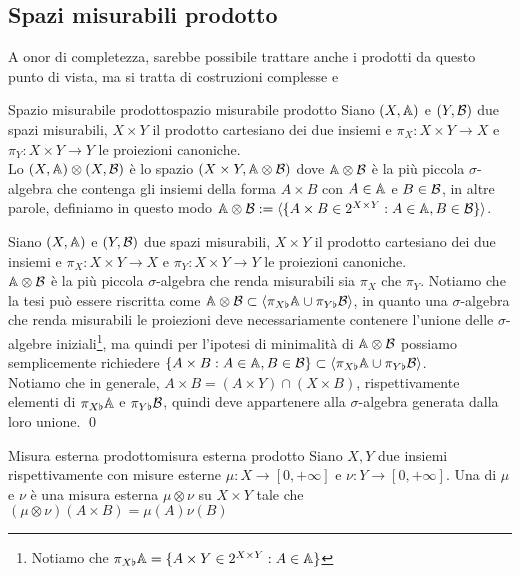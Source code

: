 \documentclass[openany]{book}
\begin{document}
\subsection{Spazi misurabili prodotto}

A onor di completezza, sarebbe possibile trattare anche i prodotti da questo punto di vista, ma si tratta di costruzioni complesse e 

\begin{definition}{Spazio misurabile prodotto}{spazio misurabile prodotto}
    Siano $(X,\mathbb{A})$ e $(Y,\mathcal{B})$ due spazi misurabili, $X\times Y$ il prodotto cartesiano dei due insiemi e $\pi_X : X\times Y \to X$ e $\pi_Y : X\times Y \to Y$ le proiezioni canoniche.\\
    Lo  $(X,\mathbb{A})\otimes (X,\mathcal{B})$ è lo spazio $(X\times Y, \mathbb{A} \otimes \mathcal{B})$ dove $\mathbb{A} \otimes\mathcal{B}$ è la più piccola $\sigma$-algebra che contenga gli insiemi della forma $A\times B$ con $A \in \mathbb{A}$ e $B \in \mathcal{B}$, in altre parole, definiamo in questo modo $\mathbb{A}\otimes\mathcal{B} := \langle\{A\times B \in 2^{X\times Y} : A \in \mathbb{A}, B\in \mathcal{B}\}\rangle$.
\end{definition}
\begin{remark}{}{}
    Siano $(X,\mathbb{A})$ e $(Y,\mathcal{B})$ due spazi misurabili, $X\times Y$ il prodotto cartesiano dei due insiemi e $\pi_X : X\times Y \to X$ e $\pi_Y : X\times Y \to Y$ le proiezioni canoniche.\\
    $\mathbb{A} \otimes \mathcal{B}$ è la più piccola $\sigma$-algebra che renda misurabili sia $\pi_X$ che $\pi_Y$.
    \proof
    Notiamo che la tesi può essere riscritta come $\mathbb{A}\otimes\mathcal{B} \subset \langle\pi_{X\flat} \mathbb{A} \cup \pi_{Y\flat} \mathcal{B}\rangle $, in quanto una $\sigma$-algebra che renda misurabili le proiezioni deve necessariamente contenere l'unione delle $\sigma$-algebre iniziali\footnote{Notiamo che $\pi_{X\flat}\mathbb{A} = \{A \times Y \in 2^{X\times Y} : A \in \mathbb{A}\}$}, ma quindi per l'ipotesi di minimalità di $\mathbb{A}\otimes\mathcal{B}$ possiamo semplicemente richiedere $\{A\times B : A \in \mathbb{A}, B \in \mathcal{B}\}\subset \langle\pi_{X\flat} \mathbb{A} \cup \pi_{Y\flat} \mathcal{B}\rangle$.\\
    Notiamo che in generale, $A \times B = (A\times Y) \cap (X \times B)$, rispettivamente elementi di $\pi_{X\flat} \mathbb{A}$ e $\pi_{Y\flat} \mathcal{B}$, quindi deve appartenere alla $\sigma$-algebra generata dalla loro unione.
    \qed
\end{remark}

\begin{definition}{Misura esterna prodotto}{misura esterna prodotto}
    Siano $X,Y$ due insiemi rispettivamente con misure esterne $\mu : X \to [0,+\infty]$ e $\nu: Y \to [0,+\infty]$. Una  di $\mu$ e $\nu$ è una misura esterna $\mu \otimes \nu$ su $X\times Y$ tale che $(\mu \otimes \nu)(A \times B) = \mu(A)\nu(B) $
\end{definition}
\end{document}

